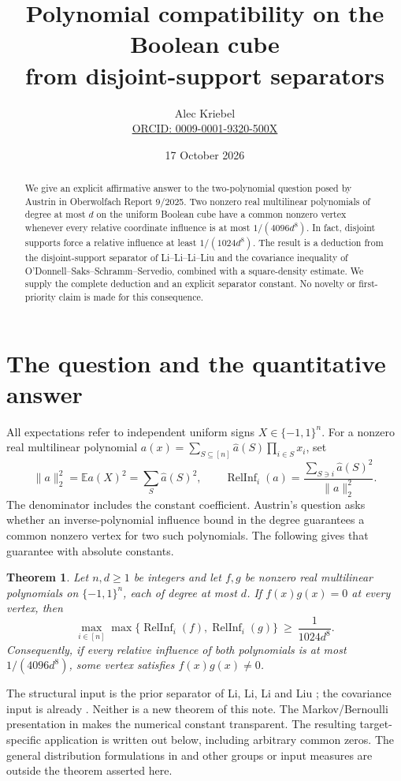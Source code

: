 \documentclass[11pt]{article}
\title{Polynomial compatibility on the Boolean cube\\from disjoint-support separators}
\author{Alec Kriebel\\
\small\href{https://orcid.org/0009-0001-9320-500X}{ORCID: 0009-0001-9320-500X}}
\date{17 October 2026}
\newtheorem{theorem}{Theorem}
\newcommand{\E}{\mathbb E}
\newcommand{\RelInf}{\operatorname{RelInf}}
\begin{document}
\maketitle
\begin{abstract}
We give an explicit affirmative answer to the two-polynomial question posed by
Austrin in Oberwolfach Report 9/2025. Two nonzero real multilinear polynomials
of degree at most \(d\) on the uniform Boolean cube have a common nonzero
vertex whenever every relative coordinate influence is at most
\(1/(4096d^8)\). In fact, disjoint supports force a relative influence at least
\(1/(1024d^8)\). The result is a deduction from the disjoint-support separator
of Li--Li--Li--Liu and the covariance inequality of
O'Donnell--Saks--Schramm--Servedio, combined with a square-density estimate.
We supply the complete deduction and an explicit separator constant.
No novelty or first-priority claim is made for this consequence.
\end{abstract}

\section{The question and the quantitative answer}
All expectations refer to independent uniform signs \(X\in\{-1,1\}^n\).
For a nonzero real multilinear polynomial
\(a(x)=\sum_{S\subseteq[n]}\widehat a(S)\prod_{i\in S}x_i\), set
\[
 \|a\|_2^2=\E a(X)^2=\sum_S\widehat a(S)^2,\qquad
 \RelInf_i(a)=\frac{\sum_{S\ni i}\widehat a(S)^2}{\|a\|_2^2}.
\]
The denominator includes the constant coefficient. Austrin's question
\cite[p.~445]{OWR} asks whether an inverse-polynomial influence bound in the
degree guarantees a common nonzero vertex for two such polynomials.
The following gives that guarantee with absolute constants.

\begin{theorem}\label{thm:main}
Let \(n,d\ge1\) be integers and let \(f,g\) be nonzero real multilinear
polynomials on \(\{-1,1\}^n\), each of degree at most \(d\).
If \(f(x)g(x)=0\) at every vertex, then
\begin{equation}\label{eq:necessary}
 \max_{i\in[n]}\max\{\RelInf_i(f),\RelInf_i(g)\}
 \ \ge\ \frac{1}{1024d^8}.
\end{equation}
Consequently, if every relative influence of both polynomials is at most
\(1/(4096d^8)\), some vertex satisfies \(f(x)g(x)\ne0\).
\end{theorem}

The structural input is the prior separator of Li, Li, Li and Liu
\cite[Lemma~3.5]{LLLL}; the covariance input is already
\cite[\S3.3, Eq.~(6)]{OSSS}. Neither is a new theorem of this note.
The Markov/Bernoulli presentation in \cite[Fact~5 and Corollary~1]{KKDWY}
makes the numerical constant transparent. The resulting target-specific
application is written out below, including arbitrary common zeros.
The general distribution formulations in \cite[Conjectures~1.2 and~5.5]{ACC}
and other groups or input measures are outside the theorem asserted here.
\end{document}
